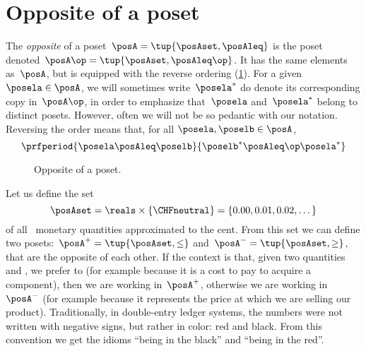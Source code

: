 
\section{Opposite of a poset}\label{sec:opposite-of-a-poset}

\begin{definition}
    \label{def:poset-opposite}
    The \emph{opposite} of a poset~$\posA=\tup{\posAset, \posAleq}$ is the poset denoted~$\posA\op=\tup{\posAset, \posAleq\op}$.
    It has the same elements as~$\posA$, but is equipped with the reverse ordering (\cref{fig:poset-opposite}).
    For a given~$\posela \in \posA$, we will sometimes write~$\posela^*$ do denote its corresponding copy in~$\posA\op$, in order to emphasize that~$\posela$ and~$\posela^*$ belong to distinct posets.
    However, often we will not be so pedantic with our notation.
    Reversing the order means that, for all $\posela,\poselb \in \posA$,
    \begin{equation}
        \prfperiod{\posela \posAleq \poselb}{\poselb^* \posAleq\op \posela^*}
    \end{equation}
\end{definition}


\begin{figure}[tbh]
    \centering
    \caption{Opposite of a poset.
    }
    \label{fig:poset-opposite}
\end{figure}

\begin{example}
    Let us define the set
    \begin{equation*}
        \posAset=\reals \times \{\text{\CHFneutral}\}=\{0.00,0.01,0.02,\dots\}
    \end{equation*}
    of all \CHFneutral \ monetary quantities approximated to the cent.
    From this set we can define two posets:~$\posA^{+} = \tup{\posAset, \leq}$ and~$\posA^{-} = \tup{\posAset, \geq}$, that are the opposite of each other.
    If the context is that, given two quantities~\unit[1]{\CHFneutral} and \unit[2]{\CHFneutral}, we prefer \unit[1]{\CHFneutral} to \unit[2]{\CHFneutral} (for example because it is a cost to pay to acquire a component), then we are working in~$\posA^{+}$, otherwise we are working in~$\posA^{-}$ (for example because it represents the price at which we are selling our product).
    Traditionally, in double-entry ledger systems, the numbers were not written with negative signs, but rather in color: red and black.
    From this convention we get the idioms ``being in the black'' and ``being in the red''.
\end{example}

